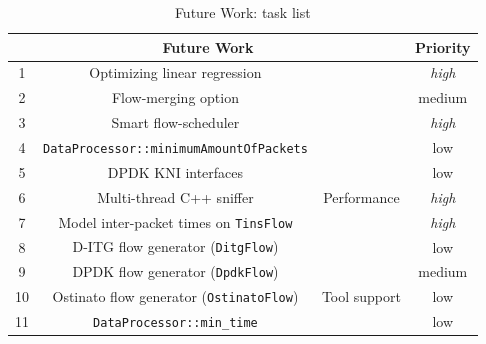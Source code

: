 \begin{table}[ht!]
	\centering
	\caption{Future Work: task list}
	\label{tab:task-list}
	\begin{tabular}{cccc}
		\hline
		\multicolumn{3}{c}{{\color[HTML]{000000} Future Work}}                                                                               & Priority                \\ \hline
		1                      & Optimizing linear regression                              &                                                 & \textit{high}                    \\
		2                      & Flow-merging option                                       &                                                 & medium                  \\
		3                      & Smart flow-scheduler                                      &                                                 & \textit{high}                    \\
		4                      & \texttt{DataProcessor::minimumAmountOfPackets}                         &                                                 & low                     \\
		5                      & DPDK KNI interfaces                                       &                                                 & low                     \\
		6                      & Multi-thread C++ sniffer                                  & \multirow{-6}{*}{Performance}                   & \textit{high}                    \\ \hline
		7                      & Model inter-packet times on \texttt{TinsFlow}           &                                                 & \textit{high}                    \\
		8                      & D-ITG flow generator (\texttt{DitgFlow})                &                                                 & low                     \\
		9                      & DPDK flow generator (\texttt{DpdkFlow})                 &                                                 & medium                     \\
		10                     & Ostinato flow generator (\texttt{OstinatoFlow})         & \multirow{-4}{*}{Tool support}                  & low                     \\ \hline
		11                     & \texttt{DataProcessor::min\_time}                       &                                                 & low                     \\

\end{tabular}
\end{table}
